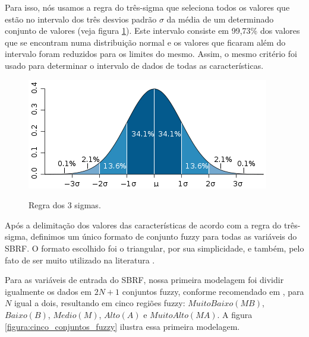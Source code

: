 \documentclass[template.tex]{subfiles}
\begin{document}
Para isso, nós usamos a regra do três-sigma \cite{kazmier2004schaum} que seleciona todos os valores que estão no intervalo dos três desvios padrão $\sigma$ da média de um determinado conjunto de valores (veja figura \ref{figura:regra_3_sigmas}). Este intervalo consiste em 99,73\% dos valores que se encontram numa distribuição normal e os valores que ficaram além do intervalo foram reduzidos para os limites do mesmo. Assim, o mesmo critério foi usado para determinar o intervalo de dados de todas as características. 

\begin{figure}[h]
\caption{Regra dos 3 sigmas.}
\centering
\includegraphics[scale=0.85]{regra-dos-3-sigma.png}
\label{figura:regra_3_sigmas}
\end{figure}

Após a delimitação dos valores das características de acordo com a regra do três-sigma, definimos um único formato de conjunto fuzzy para todas as variáveis do SBRF. O formato escolhido foi o triangular, por sua simplicidade, e também, pelo fato de ser muito utilizado na literatura \cite{alcala2009multiobjective, gacto2010integration, antonelli2012multi, cardenas2012multiobjective}.

Para as variáveis de entrada do SBRF, nossa primeira modelagem foi dividir igualmente os dados em $2N + 1$ conjuntos fuzzy, conforme recomendado em \cite{wang1992generating}, para $N$ igual a dois, resultando em cinco regiões fuzzy: $Muito Baixo (MB)$, $Baixo (B)$, $Medio (M)$, $Alto (A)$ e $Muito Alto (MA)$. A figura \ref{figura:cinco_conjuntos_fuzzy} ilustra essa primeira modelagem.
\end{document}
